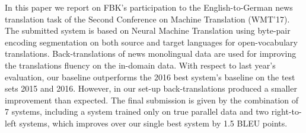 In this paper we report on FBK's participation to the English-to-German news translation task of the Second Conference on Machine Translation (WMT'17). The submitted system is based on Neural Machine Translation using byte-pair encoding segmentation on both source and target languages for open-vocabulary translations. Back-translations of news monolingual data are used for improving the translations fluency on the in-domain data. With respect to  last year's evaluation, our baseline outperforms the 2016 best system's baseline on the test sets  2015 and 2016. However, in our set-up  back-translations produced a smaller improvement than expected. The final submission is given by the combination of 7 systems, including a system trained only on true parallel data and two right-to-left systems, which improves over our single best system by 1.5 BLEU points.
